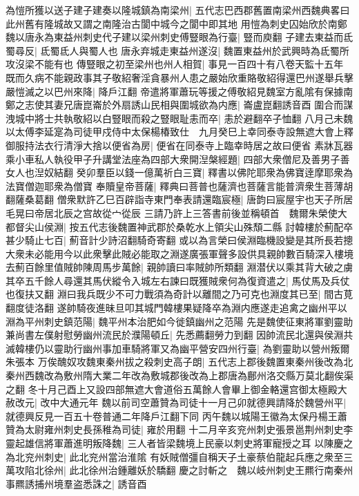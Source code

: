 為愷所獲以送子建子建奏以隆城鎮為南梁州|{
	五代志巴西郡舊置南梁州西魏典畧曰此州舊有隆城故又謂之南隆治古閬中城今之閬中即其地}
用愷為刺史囚始欣於南鄭魏以唐永為東益州刺史代子建以梁州刺史傅豎眼為行臺|{
	豎而庾翻}
子建去東益而氐蜀尋反|{
	氐蜀氐人與蜀人也}
唐永弃城走東益州遂沒|{
	魏置東益州於武興時為氐蜀所攻沒梁不能有也}
傳豎眼之初至梁州也州人相賀|{
	事見一百四十有八卷天監十五年}
既而久病不能親政事其子敬紹奢淫貪暴州人患之嚴始欣重賂敬紹得還巴州遂舉兵擊嚴愷滅之以巴州來降|{
	降戶江翻}
帝遣將軍蕭玩等援之傅敬紹見魏室方亂隂有保據南鄭之志使其妻兄唐崑崙於外扇誘山民相與圍城欲為内應|{
	崙盧崑翻誘音酉}
圍合而謀洩城中將士共執敬紹以白豎眼而殺之豎眼耻恚而卒|{
	恚於避翻卒子恤翻}
八月己未魏以太傅李延寔為司徒甲戍侍中太保楊椿致仕　九月癸巳上幸同泰寺設無遮大會上釋御服持法衣行清淨大捨以便省為房|{
	便省在同泰寺上臨幸時居之故曰便省}
素牀瓦器乘小車私人執役甲子升講堂法座為四部大衆開湼槃經題|{
	四部大衆僧尼及善男子善女人也湼奴結翻}
癸卯羣臣以錢一億萬祈白三寶|{
	釋書以佛陀耶衆為佛寶逹摩耶衆為法寶僧迦耶衆為僧寶}
奉贖皇帝菩薩|{
	釋典曰菩普也薩濟也菩薩言能普濟衆生菩薄胡翻薩桑葛翻}
僧衆默許乙巳百辟詣寺東門奉表請還臨宸極|{
	唐韵曰宸屋宇也天子所居毛晃曰帝居北辰之宫故從宀從辰}
三請乃許上三答書前後並稱頓首　魏爾朱榮使大都督尖山侯淵|{
	按五代志後魏置神武郡於桑乾水上領尖山殊頹二縣}
討韓樓於薊配卒甚少騎止七百|{
	薊音計少詩沼翻騎奇寄翻}
或以為言榮曰侯淵臨機設變是其所長若摠大衆未必能用今以此衆擊此賊必能取之淵遂廣張軍聲多設供具親帥數百騎深入樓境去薊百餘里值賊帥陳周馬步萬餘|{
	親帥讀曰率賊帥所類翻}
淵潜伏以乘其背大破之虜其卒五千餘人尋還其馬伏縱令入城左右諫曰既獲賊衆何為復資遣之|{
	馬仗馬及兵仗也復扶又翻}
淵曰我兵既少不可力戰須為奇計以離間之乃可克也淵度其已至|{
	間古莧翻度徒洛翻}
遂帥騎夜進昧旦叩其城門韓樓果疑降卒為淵内應遂走追禽之幽州平以淵為平州刺史鎮范陽|{
	魏平州本治肥如今徙鎮幽州之范陽}
先是魏使征東將軍劉靈助兼尚書左僕射慰勞幽州流民於濮陽頓丘|{
	先悉薦翻勞力到翻}
因帥流民北還與侯淵共滅韓樓仍以靈助行幽州事加車騎將軍又為幽平營安四州行臺|{
	為劉靈助以營州叛爾朱張本}
万俟醜奴攻魏東秦州拔之殺刺史高子朗|{
	五代志上郡後魏置東秦州後改為北秦州西魏改為敷州隋大業二年改為敷城郡後改為上郡唐為鄜州洛交縣万莫北翻俟渠之翻}
冬十月己酉上又設四部無遮大會道俗五萬餘人會畢上御金輅還宫御太極殿大赦改元|{
	改中大通元年}
魏以前司空蕭贊為司徒十一月己卯就德興請降於魏營州平|{
	就德興反見一百五十卷普通二年降戶江翻下同}
丙午魏以城陽王徽為太保丹楊王蕭贊為太尉雍州刺史長孫稚為司徒|{
	雍於用翻}
十二月辛亥兖州刺史張景邕荆州刺史李靈起雄信將軍蕭進明叛降魏|{
	三人者皆梁魏境上民豪以刺史將軍寵授之耳}
以陳慶之為北兖州刺史|{
	此北兖州當治淮隂}
有妖賊僧彊自稱天子土豪蔡伯龍起兵應之衆至三萬攻陷北徐州|{
	此北徐州治鍾離妖於驕翻}
慶之討斬之　魏以岐州刺史王羆行南秦州事羆誘捕州境羣盗悉誅之|{
	誘音酉}


